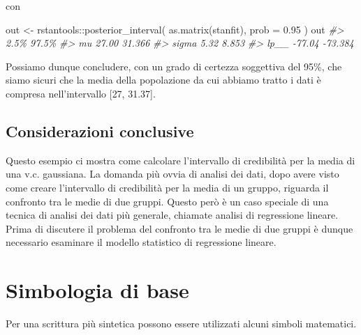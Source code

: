 \documentclass[
  11pt,
]{krantz}
\makeatletter
\newenvironment{Shaded}{\begin{snugshade}}{\end{snugshade}}
\newcommand{\AttributeTok}[1]{\textcolor[rgb]{0.61,0.61,0.61}{#1}}
\newcommand{\CommentTok}[1]{\textcolor[rgb]{0.37,0.37,0.37}{\textit{#1}}}
\newcommand{\FloatTok}[1]{\textcolor[rgb]{0.06,0.06,0.06}{#1}}
\newcommand{\FunctionTok}[1]{\textcolor[rgb]{0,0,0}{#1}}
\newcommand{\NormalTok}[1]{#1}
\newcommand{\OtherTok}[1]{\textcolor[rgb]{0.37,0.37,0.37}{#1}}
\newcommand{\SpecialCharTok}[1]{\textcolor[rgb]{0,0,0}{#1}}
\newenvironment{kframe}{%
\medskip{}
\setlength{\fboxsep}{.8em}
 \def\at@end@of@kframe{}%
 \ifinner\ifhmode%
  \def\at@end@of@kframe{\end{minipage}}%
  \begin{minipage}{\columnwidth}%
 \fi\fi%
 \def\FrameCommand##1{\hskip\@totalleftmargin \hskip-\fboxsep
 \colorbox{shadecolor}{##1}\hskip-\fboxsep
     \hskip-\linewidth \hskip-\@totalleftmargin \hskip\columnwidth}%
 \MakeFramed {\advance\hsize-\width
   \@totalleftmargin\z@ \linewidth\hsize
   \@setminipage}}%
 {\par\unskip\endMakeFramed%
 \at@end@of@kframe}
\renewenvironment{Shaded}{\begin{kframe}}{\end{kframe}}
\theoremstyle{definition}
\theoremstyle{definition}
\theoremstyle{definition}
\theoremstyle{definition}
\theoremstyle{remark}
\makeatother
\begin{document}
con

\begin{Shaded}
\begin{Highlighting}[]
\NormalTok{out }\OtherTok{\textless{}{-}}\NormalTok{ rstantools}\SpecialCharTok{::}\FunctionTok{posterior\_interval}\NormalTok{(}
  \FunctionTok{as.matrix}\NormalTok{(stanfit), }
  \AttributeTok{prob =} \FloatTok{0.95}
\NormalTok{)}
\NormalTok{out}
\CommentTok{\#\textgreater{}         2.5\%   97.5\%}
\CommentTok{\#\textgreater{} mu     27.00  31.366}
\CommentTok{\#\textgreater{} sigma   5.32   8.853}
\CommentTok{\#\textgreater{} lp\_\_  {-}77.04 {-}73.384}
\end{Highlighting}
\end{Shaded}

Possiamo dunque concludere, con un grado di certezza soggettiva del 95\%, che siamo sicuri che la media della popolazione da cui abbiamo tratto i dati è compresa nell'intervallo {[}27, 31.37{]}.

\hypertarget{considerazioni-conclusive}{%
\section*{Considerazioni conclusive}\label{considerazioni-conclusive}}


Questo esempio ci mostra come calcolare l'intervallo di credibilità per la media di una v.c. gaussiana. La domanda più ovvia di analisi dei dati, dopo avere visto come creare l'intervallo di credibilità per la media di un gruppo, riguarda il confronto tra le medie di due gruppi. Questo però è un caso speciale di una tecnica di analisi dei dati più generale, chiamate analisi di regressione lineare. Prima di discutere il problema del confronto tra le medie di due gruppi è dunque necessario esaminare il modello statistico di regressione lineare.

\mainmatter

\hypertarget{appendix-appendix}{%
\appendix {}}


\hypertarget{simbologia-di-base}{%
\chapter{Simbologia di base}\label{simbologia-di-base}}

Per una scrittura più sintetica possono essere utilizzati alcuni simboli matematici.
\end{document}

